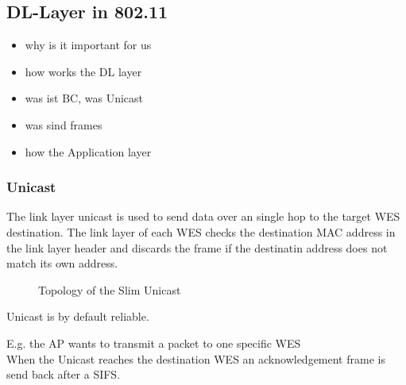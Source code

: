 \documentclass[]{ccs-thesis}
\begin{document}
\subsection{DL-Layer in 802.11}

\begin{itemize}
	\item why is it important for us
	\item how works the DL layer
	\item was ist BC, was Unicast
	\item was sind frames
	\item how the Application layer
\end{itemize}

\subsubsection{Unicast}

The link layer unicast is used to send data over an single hop to the target \ac{WES} destination.
The link layer of each \ac{WES} checks the destination MAC address in the link layer header and discards the frame if the destinatin address does not match its own address.\\

\newcommand{\inputnum}{1} 
\newcommand{\outputnum}{3}  

\begin{figure}
	\centering
	\caption{Topology of the Slim Unicast}%
	\label{fig:topologyunicast}
\end{figure}

Unicast is by default reliable.

E.g. the \ac{AP} wants to transmit a packet to one specific \ac{WES}\\
When the Unicast reaches the destination \ac{WES} an acknowledgement frame is send back after a \ac{SIFS}.
\end{document}
